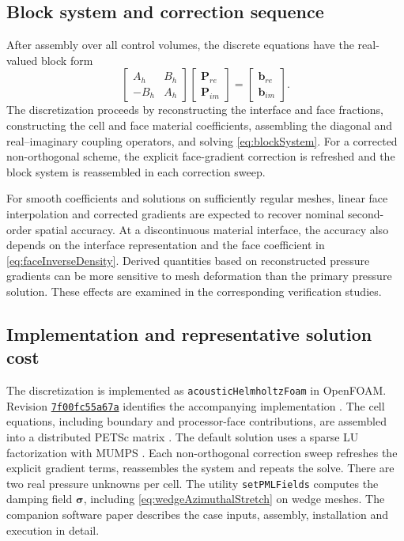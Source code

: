 \documentclass[final,12pt,nopreprintline,longtitle]{elsarticle}
\begin{document}
\subsection{Block system and correction sequence}

After assembly over all control volumes, the discrete equations have the
real-valued block form
\begin{equation}
\begin{bmatrix}
    A_h & B_h\\
    -B_h & A_h
\end{bmatrix}
\begin{bmatrix}
    \mathbf{P}_{re}\\
    \mathbf{P}_{im}
\end{bmatrix}
=
\begin{bmatrix}
    \mathbf{b}_{re}\\
    \mathbf{b}_{im}
\end{bmatrix}.
\label{eq:blockSystem}
\end{equation}
The discretization proceeds by reconstructing the interface and face fractions,
constructing the cell and face material coefficients, assembling the diagonal
and real--imaginary coupling operators, and solving \cref{eq:blockSystem}.
For a corrected non-orthogonal scheme, the explicit face-gradient correction
is refreshed and the block system is reassembled in each correction sweep.

For smooth coefficients and solutions on sufficiently regular meshes, linear
face interpolation and corrected gradients are expected to recover nominal
second-order spatial accuracy.  At a discontinuous material interface, the
accuracy also depends on the interface representation and the face coefficient
in \cref{eq:faceInverseDensity}.  Derived quantities based on reconstructed
pressure gradients can be more sensitive to mesh deformation than the primary
pressure solution.  These effects are examined in the corresponding
verification studies.

\subsection{Implementation and representative solution cost}
\label{sec:implementation}

The discretization is implemented as \texttt{acousticHelmholtzFoam} in
OpenFOAM.  Revision
\href{https://github.com/tmaric/TwoPhaseFlow/tree/7f00fc55a67aefbcfa88bdb46a4fc378bac0db0c}{\texttt{7f00fc55a67a}}
identifies the accompanying implementation
\cite{XuLiuMaric2026AcousticSoftware}.  The cell equations, including boundary
and processor-face contributions, are assembled into a distributed PETSc
matrix \cite{Balay1997}.  The default solution uses a sparse LU factorization
with MUMPS \cite{Amestoy2001}.  Each non-orthogonal correction sweep refreshes
the explicit gradient terms, reassembles the system and repeats the solve.
There are two real pressure unknowns per cell.  The utility
\texttt{setPMLFields} computes the damping field $\boldsymbol{\sigma}$,
including \cref{eq:wedgeAzimuthalStretch} on wedge meshes.  The companion
software paper
\cite{Xu2026AcousticHelmholtzFoam} describes the case inputs, assembly,
installation and execution in detail.
\end{document}
